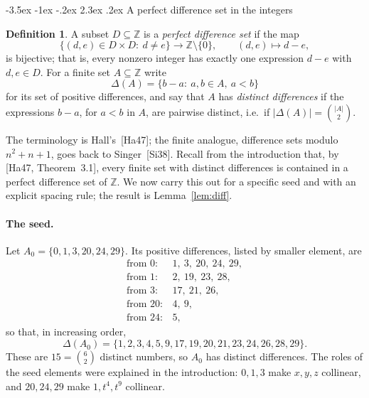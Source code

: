 \documentclass[12pt]{article}
\makeatletter
\renewcommand\section{\@startsection{section}{1}{\z@}%
  {-3.5ex \@plus -1ex \@minus -.2ex}%
  {2.3ex \@plus.2ex}%
  {\normalfont\bfseries}}
\theoremstyle{plain}
\theoremstyle{definition}
\newtheorem{definition}[theorem]{Definition}
\newcommand{\Z}{\mathbb{Z}}
\makeatother
\begin{document}
\section{A perfect difference set in the integers}\label{sec:diffset}

\begin{definition}\label{def:pds}
A subset $D\subseteq\Z$ is a \emph{perfect difference set} if the map
\[
 \{(d,e)\in D\times D:\ d\neq e\}\longrightarrow\Z\setminus\{0\},
 \qquad (d,e)\longmapsto d-e,
\]
is bijective; that is, every nonzero integer has exactly one expression
$d-e$ with $d,e\in D$.  For a finite set $A\subseteq\Z$ write
\[
 \Delta(A)=\{b-a:\ a,b\in A,\ a<b\}
\]
for its set of positive differences, and say that $A$ has
\emph{distinct differences} if the expressions $b-a$, for $a<b$ in $A$,
are pairwise distinct, i.e.\ if $|\Delta(A)|=\binom{|A|}{2}$.
\end{definition}

The terminology is Hall's~[Ha47]; the finite analogue, difference sets
modulo $n^2+n+1$, goes back to Singer~[Si38].  Recall from the
introduction that, by [Ha47, Theorem~3.1], every finite set with
distinct differences is contained in a perfect difference set of $\Z$.
We now carry this out for a specific seed and with an explicit spacing
rule; the result is Lemma~\ref{lem:diff}.

\paragraph{The seed.}
Let $A_0=\{0,1,3,20,24,29\}$.  Its positive differences, listed by
smaller element, are
\[
 \begin{array}{ll}
 \text{from }0:& 1,\ 3,\ 20,\ 24,\ 29,\\
 \text{from }1:& 2,\ 19,\ 23,\ 28,\\
 \text{from }3:& 17,\ 21,\ 26,\\
 \text{from }20:& 4,\ 9,\\
 \text{from }24:& 5,
 \end{array}
\]
so that, in increasing order,
\[
 \Delta(A_0)=\{1,2,3,4,5,9,17,19,20,21,23,24,26,28,29\}.
\]
These are $15=\binom62$ distinct numbers, so $A_0$ has distinct
differences.  The roles of the seed elements were explained in the
introduction: $0,1,3$ make $x,y,z$ collinear, and $20,24,29$ make
$1,t^4,t^9$ collinear.
\end{document}
